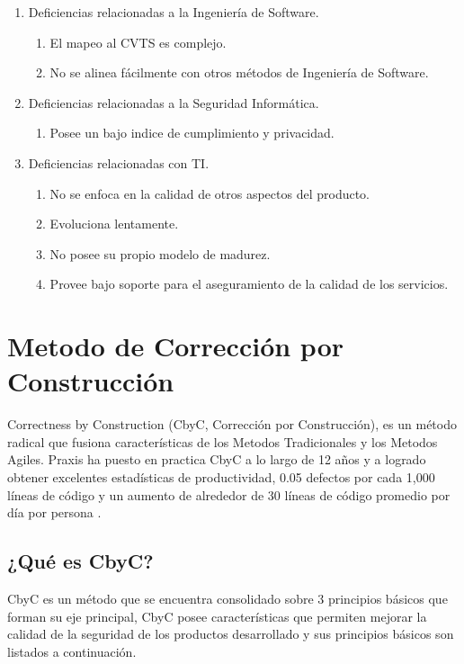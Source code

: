 \documentclass[runningheads,a4paper]{llncs}
\begin{document}
\begin{enumerate}
	\item Deficiencias relacionadas a la Ingeniería de \gls{Software}.
		\begin{enumerate}
			\item El mapeo al \gls{CVTS} es complejo.
			\item No se alinea fácilmente con otros métodos de Ingeniería de Software.\\
			
		\end{enumerate}
	\item Deficiencias relacionadas a la Seguridad Informática.
		\begin{enumerate}
			\item Posee un bajo indice de cumplimiento y privacidad.\\
			
		\end{enumerate}
	\item Deficiencias relacionadas con \gls{TI}.
		\begin{enumerate}
			\item No se enfoca en la calidad de otros aspectos del producto.
			\item Evoluciona lentamente.
			\item No posee su propio modelo de madurez.
			\item Provee bajo soporte para el aseguramiento de la calidad de los servicios.\\
			
		\end{enumerate}
\end{enumerate}
\section{Metodo de Corrección por Construcción}
Correctness by Construction (CbyC, Corrección por Construcción), es un método radical que fusiona características de los \gls{Metodos Tradicionales} y los \gls{Metodos Agiles}. \gls{Praxis} ha puesto en practica \gls{CbyC} a lo largo de 12 años y a logrado obtener excelentes estadísticas de productividad, 0.05 defectos por cada 1,000 líneas de código y un aumento de alrededor de 30 líneas de código promedio por día por persona \cite{CbyCIntroduction}.   

\subsection{¿Qué es \gls{CbyC}?}
\gls{CbyC} es un método que se encuentra consolidado sobre 3 principios básicos que forman su eje principal, \gls{CbyC} posee características que permiten mejorar la calidad de la seguridad de los productos desarrollado y sus principios básicos son listados a continuación.
\end{document}
